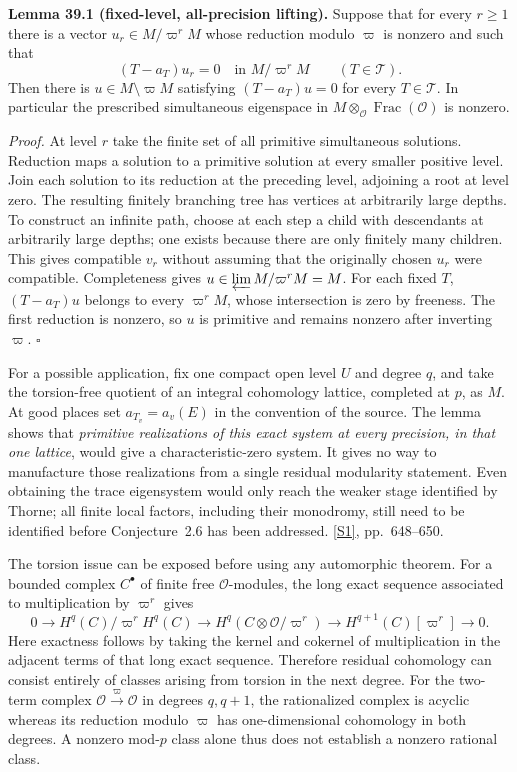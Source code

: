 \documentclass[11pt,a4paper]{article}
\newcommand{\sref}[2]{\hyperlink{source:#1:#2}{[S#2]}}
\numberwithin{equation}{section}
\begin{document}
\textbf{Lemma 39.1 (fixed-level, all-precision lifting).}
Suppose that for every $r\ge1$ there is a vector $u_r\in M/\varpi^rM$ whose
reduction modulo $\varpi$ is nonzero and such that
\[
 (T-a_T)u_r=0\quad\text{in }M/\varpi^rM\qquad(T\in\mathcal T).
\]
Then there is $u\in M\setminus\varpi M$ satisfying $(T-a_T)u=0$ for every
$T\in\mathcal T$. In particular the prescribed simultaneous eigenspace in
$M\otimes_{\mathcal O}\operatorname{Frac}(\mathcal O)$ is nonzero.

\emph{Proof.}
At level $r$ take the finite set of all primitive simultaneous solutions.
Reduction maps a solution to a primitive solution at every smaller positive
level. Join each solution to its reduction at the preceding level, adjoining
a root at level zero. The resulting finitely branching tree has vertices at
arbitrarily large depths. To construct an infinite path, choose at each step
a child with descendants at arbitrarily large depths; one exists because
there are only finitely many children. This gives compatible $v_r$ without
assuming that the originally chosen $u_r$ were compatible. Completeness gives
$u\in\varprojlim M/\varpi^rM=M$. For each fixed $T$, $(T-a_T)u$ belongs to
every $\varpi^rM$, whose intersection is zero by freeness. The first reduction
is nonzero, so $u$ is primitive and remains nonzero after inverting $\varpi$.
\hfill$\square$

For a possible application, fix one compact open level $U$ and degree $q$,
and take the torsion-free quotient of an integral cohomology lattice, completed
at $p$, as $M$. At good places set $a_{T_v}=a_v(E)$ in the convention of the
source. The lemma shows that \emph{primitive realizations of this exact system
at every precision, in that one lattice}, would give a characteristic-zero
system. It gives no way to manufacture those realizations from a single
residual modularity statement. Even obtaining the trace eigensystem would
only reach the weaker stage identified by Thorne; all finite local factors,
including their monodromy, still need to be identified before Conjecture~2.6
has been addressed. \sref{39}{1}, pp.~648--650.

The torsion issue can be exposed before using any automorphic theorem. For a
bounded complex $C^\bullet$ of finite free $\mathcal O$-modules, the long exact
sequence associated to multiplication by $\varpi^r$ gives
\[
0\longrightarrow H^q(C)/\varpi^rH^q(C)
\longrightarrow H^q(C\otimes\mathcal O/\varpi^r)
\longrightarrow H^{q+1}(C)[\varpi^r]\longrightarrow0.
\]
Here exactness follows by taking the kernel and cokernel of multiplication in
the adjacent terms of that long exact sequence. Therefore residual cohomology
can consist entirely of classes arising from torsion in the next degree.
For the two-term complex $\mathcal O\xrightarrow{\varpi}\mathcal O$ in degrees
$q,q+1$, the rationalized complex is acyclic whereas its reduction modulo
$\varpi$ has one-dimensional cohomology in both degrees. A nonzero mod-$p$
class alone thus does not establish a nonzero rational class.
\end{document}
